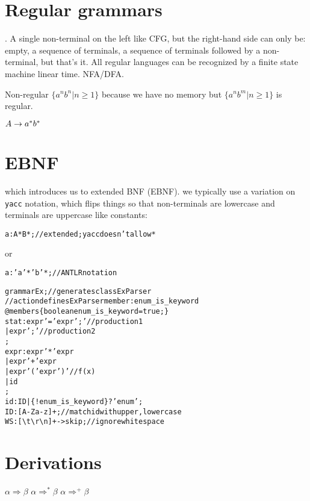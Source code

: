 \documentclass[11pt,twocolumn,nocopyright]{sigplanconf}
\begin{document}
\section{Regular grammars}. A single non-terminal on the left like CFG, but the right-hand side can only be: empty, a sequence of terminals, a sequence of terminals followed by a non-terminal, but that's it. All regular languages can be recognized by a finite state machine linear time. NFA/DFA.

Non-regular $\{a^nb^n | n \ge 1\}$ because we have no memory but $\{a^nb^m | n \ge 1\}$ is regular.

\noindent $
A \rightarrow a^* b^*\\
$

\section{EBNF}

which introduces us to extended BNF (EBNF). we typically use a variation on {\tt yacc} notation, which flips things so that non-terminals are lowercase and terminals are uppercase like constants:

\begin{alltt}
a : A* B* ; // extended; yacc doesn't allow *
\end{alltt}

or

\begin{alltt}
a : 'a'* 'b'* ; // ANTLR notation
\end{alltt}

\begin{alltt}\small
grammar Ex; // generates class ExParser
// action defines ExParser member: enum_is_keyword
@members \{boolean enum_is_keyword = true;\}
stat: expr '=' expr ';' // production 1
    | expr ';'          // production 2
    ;
expr: expr '*' expr
    | expr '+' expr
    | expr '(' expr ')' // f(x)
    | id
    ;
id  : ID | \{!enum_is_keyword\}? 'enum' ;
ID  : [A-Za-z]+ ; // match id with upper, lowercase
WS  : [ \textbackslash{}t\textbackslash{}r\textbackslash{}n]+ -> skip ; // ignore whitespace
\end{alltt}

\section{Derivations}

$\alpha \Rightarrow \beta$ $\alpha \Rightarrow^* \beta$ $\alpha \Rightarrow^+ \beta$
\end{document}
